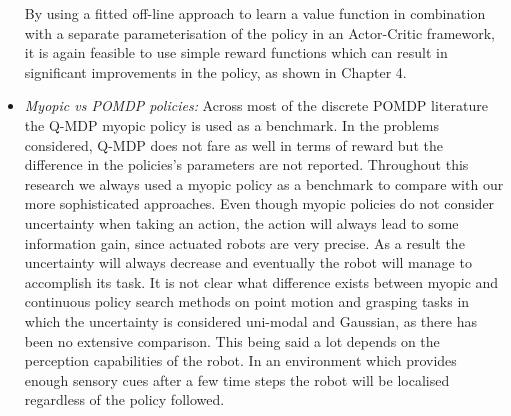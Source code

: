 \begin{itemize}
 By using a fitted off-line approach to learn a value function in combination with 
 a separate parameterisation of the policy in an Actor-Critic framework, it is
 again feasible to use simple reward functions which can result in significant 
 improvements in the policy, as shown in Chapter 4.
 
  \item \textit{Myopic vs POMDP policies:} Across most of the discrete POMDP literature the Q-MDP myopic policy is 
 used as a benchmark. In the problems considered, Q-MDP does not fare as well in terms of reward but the difference 
 in the policies's parameters are not reported. Throughout this research we always used a myopic policy as a benchmark 
 to compare with our more sophisticated approaches. Even though myopic policies do not consider uncertainty when taking an action,
 the action will always lead to some information gain, since actuated robots are very precise. As a result the 
 uncertainty will always decrease and eventually the robot will manage to accomplish its task.
 It is not clear what difference exists between myopic and continuous policy search methods on point motion and 
 grasping tasks in which the uncertainty is considered uni-modal and Gaussian, as there has been no extensive comparison.
 This being said a lot depends on the perception capabilities of the robot. In an environment which provides enough
 sensory cues after a few time steps the robot will be localised regardless of the policy followed. 
\end{itemize}



% 





